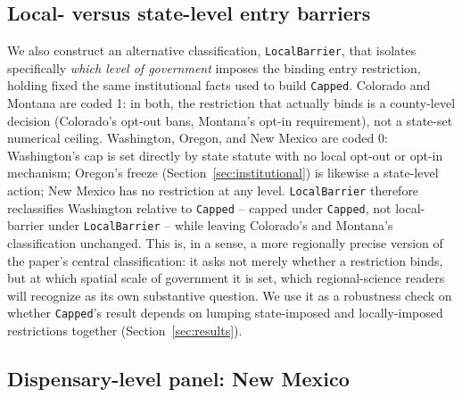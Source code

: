 \documentclass[12pt]{article}
\begin{document}
\subsection{Local- versus state-level entry barriers}
\label{sec:localbarrier}

We also construct an alternative classification, \texttt{LocalBarrier}, that isolates specifically \emph{which
level of government} imposes the binding entry restriction, holding fixed the same institutional facts used to
build \texttt{Capped}. Colorado and Montana are coded 1: in both, the restriction that actually binds is a
county-level decision (Colorado's opt-out bans, Montana's opt-in requirement), not a state-set numerical
ceiling. Washington, Oregon, and New Mexico are coded 0: Washington's cap is set directly by state statute with
no local opt-out or opt-in mechanism; Oregon's freeze (Section~\ref{sec:institutional}) is likewise a
state-level action; New Mexico has no restriction at any level. \texttt{LocalBarrier} therefore reclassifies
Washington relative to \texttt{Capped} -- capped under \texttt{Capped}, not local-barrier under
\texttt{LocalBarrier} -- while leaving Colorado's and Montana's classification unchanged. This is, in a sense,
a more regionally precise version of the paper's central classification: it asks not merely whether a
restriction binds, but at which spatial scale of government it is set, which regional-science readers will
recognize as its own substantive question. We use it as a robustness check on whether \texttt{Capped}'s result
depends on lumping state-imposed and locally-imposed restrictions together (Section~\ref{sec:results}).

\subsection{Dispensary-level panel: New Mexico}
\label{sec:nmdispensary}
\end{document}
